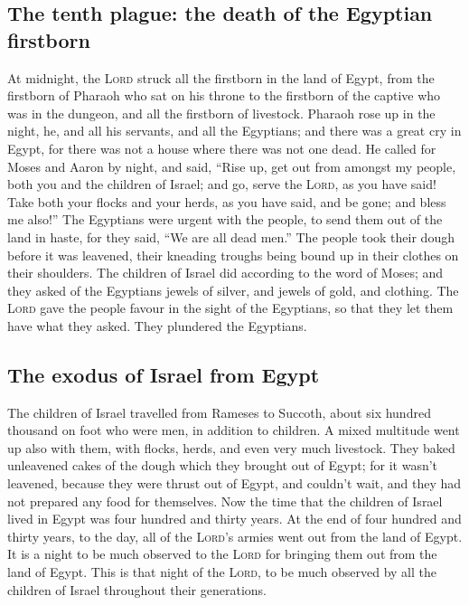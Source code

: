 \hypertarget{the-tenth-plague-the-death-of-the-egyptian-firstborn}{%
\subsection{The tenth plague: the death of the Egyptian
firstborn}\label{the-tenth-plague-the-death-of-the-egyptian-firstborn}}

 At midnight, the \textsc{Lord} struck all the firstborn
in the land of Egypt, from the firstborn of Pharaoh who sat on his
throne to the firstborn of the captive who was in the dungeon, and all
the firstborn of livestock.  Pharaoh rose up in the
night, he, and all his servants, and all the Egyptians; and there was a
great cry in Egypt, for there was not a house where there was not one
dead.  He called for Moses and Aaron by night, and said,
``Rise up, get out from amongst my people, both you and the children of
Israel; and go, serve the \textsc{Lord}, as you have said!
 Take both your flocks and your herds, as you have said,
and be gone; and bless me also!''  The Egyptians were
urgent with the people, to send them out of the land in haste, for they
said, ``We are all dead men.''  The people took their
dough before it was leavened, their kneading troughs being bound up in
their clothes on their shoulders.  The children of Israel
did according to the word of Moses; and they asked of the Egyptians
jewels of silver, and jewels of gold, and clothing.  The
\textsc{Lord} gave the people favour in the sight of the Egyptians, so
that they let them have what they asked. They plundered the Egyptians.

\hypertarget{the-exodus-of-israel-from-egypt}{%
\subsection{The exodus of Israel from
Egypt}\label{the-exodus-of-israel-from-egypt}}

 The children of Israel travelled from Rameses to
Succoth, about six hundred thousand on foot who were men, in addition to
children.  A mixed multitude went up also with them, with
flocks, herds, and even very much livestock.  They baked
unleavened cakes of the dough which they brought out of Egypt; for it
wasn't leavened, because they were thrust out of Egypt, and couldn't
wait, and they had not prepared any food for themselves. 
Now the time that the children of Israel lived in Egypt was four hundred
and thirty years.  At the end of four hundred and thirty
years, to the day, all of the \textsc{Lord}'s armies went out from the
land of Egypt.  It is a night to be much observed to the
\textsc{Lord} for bringing them out from the land of Egypt. This is that
night of the \textsc{Lord}, to be much observed by all the children of
Israel throughout their generations.

